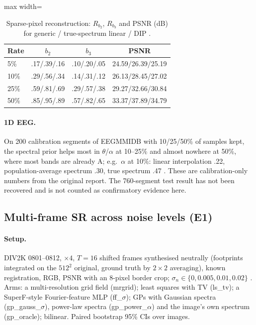 \begin{table}[t]\centering\small
\caption{Sparse-pixel reconstruction: $R_{b_2}$, $R_{b_3}$ and PSNR (dB) for
generic / true-spectrum linear / DIP .}\label{tab:sparse}
\setlength{\tabcolsep}{3pt}
\begin{adjustbox}{max width=\linewidth}\begin{tabular}{lccc}\toprule
Rate & $b_2$ & $b_3$ & PSNR\\\midrule
5\% & .17/.39/.16 & .10/.20/.05 & 24.59/26.39/25.19\\
10\% & .29/.56/.34 & .14/.31/.12 & 26.13/28.45/27.02\\
25\% & .59/.81/.69 & .29/.57/.38 & 29.27/32.66/30.84\\
50\% & .85/.95/.89 & .57/.82/.65 & 33.37/37.89/34.79\\
\bottomrule\end{tabular}\end{adjustbox}
\end{table}

\paragraph{1D EEG.} On 200 calibration segments of EEGMMIDB
\citep{schalk2009eeg,schalk2004bci2000} with 10/25/50\% of samples
kept, the spectral prior helps most in $\theta$/$\alpha$ at 10--25\% and
almost nowhere at 50\%, where most bands are already A; e.g.\ $\alpha$ at
10\%: linear interpolation .22, population-average spectrum .30, true
spectrum .47 . These are calibration-only numbers from the original report. The 760-segment test result has not been recovered and is not counted as confirmatory evidence here.

\subsection{Multi-frame SR across noise levels (E1)}\label{sec:exp-ab}

\paragraph{Setup.} DIV2K 0801--0812, $\times4$, $T=16$ shifted frames
synthesised neutrally (footprints integrated on the $512^2$ original, ground
truth by $2\times2$ averaging), known registration, RGB, PSNR with an 8-pixel
border crop; $\sigma_n\in\{0,0.005,0.01,0.02\}$ . Arms: a
multi-resolution grid field (mrgrid); least squares with TV (ls\_tv); a
SuperF-style Fourier-feature MLP (ff\_$\sigma$); GPs with Gaussian spectra
(gp\_gauss\_$\sigma$), power-law spectra (gp\_power\_$\alpha$) and the
image's own spectrum (gp\_oracle); bilinear. Paired bootstrap 95\% CIs over
images.


